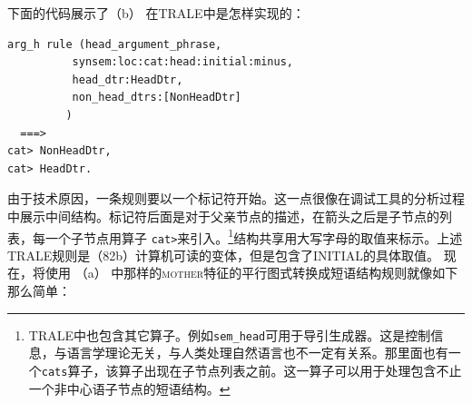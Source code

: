 下面的代码展示了（b） 在TRALE中是怎样实现的：
\begin{verbatim}
arg_h rule (head_argument_phrase,
          synsem:loc:cat:head:initial:minus,
          head_dtr:HeadDtr,
          non_head_dtrs:[NonHeadDtr]
         )
  ===>
cat> NonHeadDtr,
cat> HeadDtr.
\end{verbatim}
由于技术原因，一条规则要以一个标记符开始。这一点很像在调试工具的分析过程中展示中间结构。标记符后面是对于父亲节点的描述，在箭头之后是子节点的列表，每一个子节点用算子 \verb+cat>+来引入。\footnote{
  TRALE中也包含其它算子。例如\texttt{sem\_head}可用于导引生成器。这是控制信息，与语言学理论无关，与人类处理自然语言也不一定有关系。那里面也有一个\texttt{cats}算子，该算子出现在子节点列表之前。这一算子可以用于处理包含不止一个非中心语子节点的短语结构。%
}结构共享用大写字母的取值来标示。上述TRALE规则是（82b）计算机可读的变体，但是包含了INITIAL的具体取值。
现在，将使用 （a） 中那样的\textsc{mother}特征的平行图式转换成短语结构规则就像如下那么简单：
\eal
\ex {}

